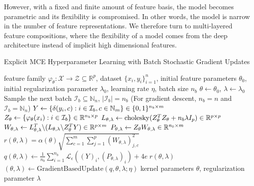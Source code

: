\documentclass{llncs}
\numberwithin{equation}{section}
\numberwithin{table}{section}
\numberwithin{algorithm}{section}
\begin{document}
	However, with a fixed and finite amount of feature basis, the model becomes parametric and its flexibility is compromised. In other words, the model is narrow in the number of feature representations. We therefore turn to multi-layered feature compositions, where the flexibility of a model comes from the deep architecture instead of implicit high dimensional features.
	
	\begin{algorithm}[tb]
		\caption{Explicit \gls{MCE} Hyperparameter Learning with Batch Stochastic Gradient Updates}
		\label{alg:explicit_multiclass_conditional_embedding_training}
		\begin{algorithmic}[1]
			 feature family $\varphi_{\theta} : \mathcal{X} \to \mathcal{Z} \subseteq \mathbb{R}^{p}$, dataset $\{x_{i}, y_{i}\}_{i = 1}^{n}$, initial feature parameters $\theta_{0}$, initial regularization parameter $\lambda_{0}$, learning rate $\eta$, batch size $n_{b}$
			\STATE $\theta \leftarrow \theta_{0}$, $\lambda \leftarrow \lambda_{0}$
			\REPEAT
			\STATE Sample the next batch $\mathcal{I}_{b} \subseteq \mathbb{N}_{n}$, $| \mathcal{I}_{b} | = n_{b}$ \hspace{\fill} (For gradient descent, $n_{b} = n$ and $\mathcal{I}_{b} = \mathbb{N}_{n}$)
			\STATE $Y \leftarrow \{\delta(y_{i}, c) : i \in \mathcal{I}_{b}, c \in \mathbb{N}_{m}\} \hspace{\fill} \in \{0, 1\}^{n_{b} \times m}$
			\STATE $Z_{\theta} \leftarrow \{\varphi_{\theta}(x_{i}) : i \in \mathcal{I}_{b}\} \hspace{\fill} \in \mathbb{R}^{n_{b} \times p}$
			\STATE $L_{\theta, \lambda} \leftarrow \mathrm{cholesky}(Z_{\theta}^{T} Z_{\theta} + n_{b} \lambda I_{p}) \hspace{\fill} \in \mathbb{R}^{p \times p}$
			\STATE $W_{\theta, \lambda} \leftarrow L_{\theta, \lambda}^{T} \backslash (L_{\theta, \lambda} \backslash Z_{\theta}^{T} Y) \hspace{\fill} \in \mathbb{R}^{p \times m}$
			\STATE $P_{\theta, \lambda} \leftarrow Z_{\theta} W_{\theta, \lambda} \hspace{\fill} \in \mathbb{R}^{n_{b} \times m}$
			\STATE $r(\theta, \lambda) = \alpha(\theta) \sqrt{\sum_{c = 1}^{m} \sum_{j = 1}^{p} (W_{\theta, \lambda})_{j, c}^{2}}$
			\STATE $q(\theta, \lambda) \leftarrow \frac{1}{n_{b}} \sum_{i = 1}^{n_{b}} \mathcal{L}_{\epsilon}((Y)_{i}, (P_{\theta, \lambda})_{i}) + 4 e \; r(\theta, \lambda)$
			\STATE $(\theta, \lambda) \leftarrow \mathrm{GradientBasedUpdate}(q, \theta, \lambda; \eta)$ %
			 kernel parameters $\theta$, regularization parameter $\lambda$
		\end{algorithmic}
	\end{algorithm}
	
\end{document}
